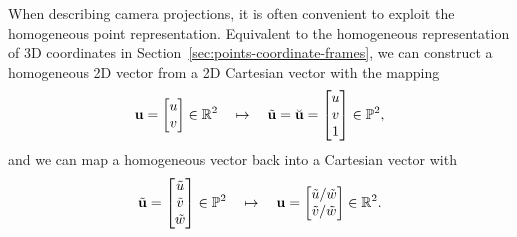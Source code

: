 When describing camera projections, it is often convenient to exploit the homogeneous point representation.
Equivalent to the homogeneous representation of 3D coordinates in Section~\ref{sec:points-coordinate-frames}, we can construct a homogeneous 2D vector from a 2D Cartesian vector with the mapping
\begin{equation} \label{eq:cart-to-homo-2d}
  {\boldsymbol{\mathbf{u}}} = 
  \begin{bmatrix}
  u\\
  v
  \end{bmatrix}
  \in {\mathbb R}^2
  \quad \mapsto \quad
  \tilde{{\boldsymbol{\mathbf{u}}}} = \breve{{\boldsymbol{\mathbf{u}}}} =
  \begin{bmatrix}
  u\\
  v\\
  1
  \end{bmatrix}
  \in {\mathbb P}^2,
\end{equation}
and we can map a homogeneous vector back into a Cartesian vector with
\begin{equation} \label{eq:homo-to-cart-2d}
  \tilde{{\boldsymbol{\mathbf{u}}}} =
  \begin{bmatrix}
  \tilde{u}\\
  \tilde{v}\\
  \tilde{w}
  \end{bmatrix}
  \in {\mathbb P}^2
  \quad \mapsto \quad
  {\boldsymbol{\mathbf{u}}} = 
  \begin{bmatrix}
  \tilde{u} / \tilde{w}\\
  \tilde{v} / \tilde{w}
  \end{bmatrix}
  \in {\mathbb R}^2.
\end{equation}

